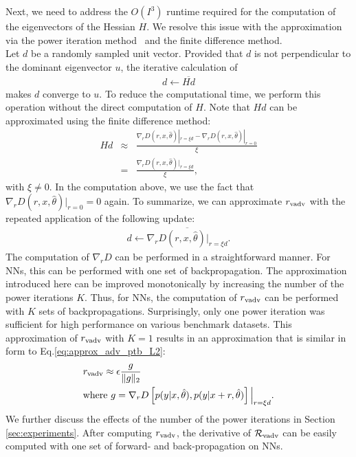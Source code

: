 \documentclass[10pt,journal,compsoc]{IEEEtran}
\begin{document}
Next, we need to address the $O(I^3)$ runtime required for the computation of the eigenvectors of the Hessian $H$. We resolve this issue with the approximation via the power iteration method~\cite{golub2000eigenvalue} and the finite difference method.\\
Let $d$ be a randomly sampled unit vector. 
Provided that $d$ is not perpendicular to the dominant eigenvector $u$, the iterative calculation of
\begin{eqnarray}
 d \leftarrow \overline{H d} \label{eq:power_method}
\end{eqnarray}
makes $d$ converge to $u$. 
To reduce the computational time, we perform this operation without the direct computation of $H$. 
Note that $H d$ can be approximated using the finite difference method:
\begin{eqnarray}
	H d &\approx& \frac{\nabla_{r} D(r,x, \hat{\theta}) |_{r=\xi d} - \nabla_{r} D(r,x,\hat{\theta})|_{r=0}}{\xi} \nonumber \\
	&=& \frac{\nabla_{r}D(r,x,\hat{\theta})|_{r=\xi d}}{\xi}, \label{eq:dif_method}
\end{eqnarray}
with $\xi \neq 0$. 
In the computation above, we use the fact that $\nabla_r D(r,x,\hat{\theta})|_{r=0} = 0$ again. 
To summarize, we can approximate $r_{\rm vadv}$ with the repeated application of the following update: 
\begin{eqnarray}
d \leftarrow \overline{\nabla_{r} D(r,x,\hat{\theta})|_{r=\xi d}}.
\end{eqnarray}
The computation of $\nabla_r D$ can be performed in a straightforward manner. For NNs, this can be performed with one set of backpropagation. 
The approximation introduced here can be improved monotonically by increasing the number of the power iterations $K$. 
Thus, for NNs, the computation of $r_{\rm vadv}$ can be performed with $K$ sets of backpropagations. 
Surprisingly, only one power iteration was sufficient for high performance on various benchmark datasets. 
This approximation of $r_{\rm vadv}$ with $K=1$ results in an approximation that is similar in form to Eq.\eqref{eq:approx_adv_ptb_L2}:
\begin{align}
	&r_{\rm vadv} \approx  \epsilon \frac{g}{\|g\|_2} \\
    &{\rm where}\ g=\nabla_r D\left[p(y|x,\hat{\theta}), p(y|x+r, \hat{\theta})\right]\Big|_{r=\xi d}.
\end{align}
We further discuss the effects of the number of the power iterations in Section \ref{sec:experiments}.
After computing $r_{\rm vadv}$, the derivative of $\mathcal{R}_{\rm vadv}$ can be easily computed with one set of forward- and back-propagation on NNs.
\end{document}
